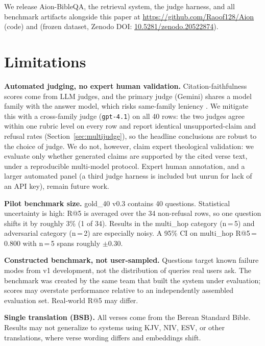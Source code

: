 \documentclass[11pt]{article}
\begin{document}
We release Aion-BibleQA, the retrieval system, the judge harness, and all benchmark artifacts alongside this paper at \url{https://github.com/Raoof128/Aion} (code) and \citep{aion2026benchmark} (frozen dataset, Zenodo DOI: \href{https://doi.org/10.5281/zenodo.20522874}{10.5281/zenodo.20522874}).

\section*{Limitations}

\textbf{Automated judging, no expert human validation.} Citation-faithfulness scores come from LLM judges, and the primary judge (Gemini) shares a model family with the answer model, which risks same-family leniency \citep{zheng2023judging}. We mitigate this with a cross-family judge (\texttt{gpt-4.1}) on all 40 rows: the two judges agree within one rubric level on every row and report identical unsupported-claim and refusal rates (Section~\ref{sec:multijudge}), so the headline conclusions are robust to the choice of judge. We do not, however, claim expert theological validation: we evaluate only whether generated claims are supported by the cited verse text, under a reproducible multi-model protocol. Expert human annotation, and a larger automated panel (a third judge harness is included but unrun for lack of an API key), remain future work.

\textbf{Pilot benchmark size.} gold\_40 v0.3 contains 40 questions. Statistical uncertainty is high: R@5 is averaged over the 34 non-refusal rows, so one question shifts it by roughly 3\% (1 of 34). Results in the multi\_hop category (n\,=\,5) and adversarial category (n\,=\,2) are especially noisy. A 95\% CI on multi\_hop R@5\,=\,0.800 with n\,=\,5 spans roughly $\pm$0.30.

\textbf{Constructed benchmark, not user-sampled.} Questions target known failure modes from v1 development, not the distribution of queries real users ask. The benchmark was created by the same team that built the system under evaluation; scores may overstate performance relative to an independently assembled evaluation set. Real-world R@5 may differ.

\textbf{Single translation (BSB).} All verses come from the Berean Standard Bible. Results may not generalize to systems using KJV, NIV, ESV, or other translations, where verse wording differs and embeddings shift.
\end{document}
